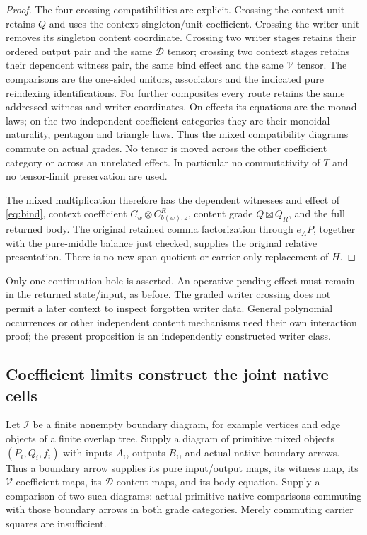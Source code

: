 \documentclass[11pt]{article}
\begin{document}
\begin{proof}
The four crossing compatibilities are explicit. Crossing the context unit retains $Q$ and uses the context singleton/unit coefficient. Crossing the writer unit removes its singleton content coordinate. Crossing two writer stages retains their ordered output pair and the same $\mathcal D$ tensor; crossing two context stages retains their dependent witness pair, the same bind effect and the same $\mathcal V$ tensor. The comparisons are the one-sided unitors, associators and the indicated pure reindexing identifications. For further composites every route retains the same addressed witness and writer coordinates. On effects its equations are the monad laws; on the two independent coefficient categories they are their monoidal naturality, pentagon and triangle laws. Thus the mixed compatibility diagrams commute on actual grades. No tensor is moved across the other coefficient category or across an unrelated effect. In particular no commutativity of $T$ and no tensor-limit preservation are used.

The mixed multiplication therefore has the dependent witnesses and effect of \eqref{eq:bind}, context coefficient $C_w\otimes C^R_{b(w),z}$, content grade $Q\boxtimes Q_R$, and the full returned body. The original retained comma factorization through $e_AP$, together with the pure-middle balance just checked, supplies the original relative presentation. There is no new span quotient or carrier-only replacement of $H$.
\end{proof}

Only one continuation hole is asserted. An operative pending effect must remain in the returned state/input, as before. The graded writer crossing does not permit a later context to inspect forgotten writer data. General polynomial occurrences or other independent content mechanisms need their own interaction proof; the present proposition is an independently constructed writer class.

\subsection{Coefficient limits construct the joint native cells}

Let $\mathcal I$ be a finite nonempty boundary diagram, for example vertices and edge objects of a finite overlap tree. Supply a diagram of primitive mixed objects $(P_i,Q_i,f_i)$ with inputs $A_i$, outputs $B_i$, and actual native boundary arrows. Thus a boundary arrow supplies its pure input/output maps, its witness map, its $\mathcal V$ coefficient maps, its $\mathcal D$ content maps, and its body equation. Supply a comparison of two such diagrams: actual primitive native comparisons commuting with those boundary arrows in both grade categories. Merely commuting carrier squares are insufficient.
\end{document}
